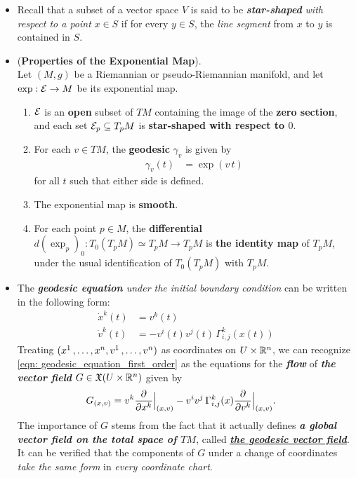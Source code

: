 \documentclass[11pt]{article}
\begin{document}
\begin{itemize}
\item \begin{remark}
Recall that a subset of a vector space $V$ is said to be \emph{\textbf{star-shaped}} \emph{with respect to a point} $x \in S$ if for every $y \in S$, the \emph{line segment} from $x$ to $y$ is contained in $S$.
\end{remark}

\item \begin{proposition}(\textbf{Properties of the Exponential Map}). \citep{lee2018introduction}\\
Let $(M, g)$ be a Riemannian or pseudo-Riemannian manifold, and let $\exp: {\mathcal E} \rightarrow M$ be its exponential map.
\begin{enumerate}
\item  ${\mathcal E}$ is an \textbf{open} subset of $TM$ containing the image of the \textbf{zero section}, and each
set ${\mathcal E}_p \subseteq T_{p}M$ is \textbf{star-shaped with respect to $0$}.
\item For each $v \in TM$, the \textbf{geodesic} $\gamma_v$ is given by
\begin{align}
\gamma_{v}(t) &= \exp(v\,t) \label{eqn: exp_map_geodesic}
\end{align} for all $t$ such that either side is defined.
\item The exponential map is \textbf{smooth}.
\item For each point $p \in M$, the \textbf{differential} $d(\exp_p)_0: T_0(T_{p}M) \simeq T_{p}M \rightarrow T_{p}M$ is \textbf{the identity map} of $T_{p}M$, under the usual identification of $T_{0}(T_{p}M)$ with $T_{p}M$.
\end{enumerate}
\end{proposition}

\item \begin{remark} The \emph{\textbf{geodesic equation} under the initial boundary condition} can be written in the following form:
\begin{align}
\dot{x}^k(t) &= v^{k}(t) \\
\dot{v}^k(t) &= - v^{i}(t)v^j(t)\,\Gamma_{i,j}^{k}(x(t)) \label{eqn: geodesic_equation_first_order}
\end{align} Treating $(x^1 \,{,}\ldots{,}\, x^n, v^1 \,{,}\ldots{,}\, v^n)$ as coordinates on $U \times {\mathbb R}^n$, we can recognize \eqref{eqn: geodesic_equation_first_order} as the equations for the \textbf{\emph{flow}} of \textbf{\emph{the vector field}} $G \in {\mathfrak X}(U \times {\mathbb R}^n)$ given by
\begin{align}
G_{(x, v)} &= v^k\frac{\partial }{ \partial x^k}\Bigr|_{(x, v)} - v^{i}v^j\,\Gamma_{i,j}^{k}(x)\frac{\partial }{ \partial v^k}\Bigr|_{(x, v)}.
\end{align} The importance of $G$ stems from the fact that it actually defines \emph{\textbf{a global vector field on the total space of $TM$}}, called \underline{\emph{\textbf{the geodesic vector field}}}. It can be verified that the components of $G$ under a change of coordinates \emph{take the same form} in \emph{every coordinate chart}.


\end{remark}
\end{itemize}
\end{document}
